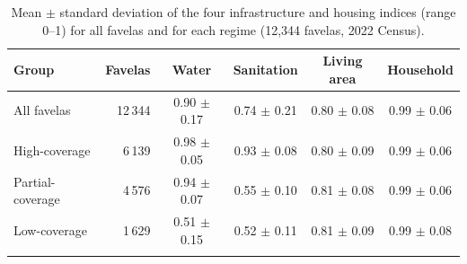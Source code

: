 \begin{table}[h]
\caption{Mean $\pm$ standard deviation of the four infrastructure and housing indices (range 0--1) for all favelas and for each regime (12,344 favelas, 2022 Census).}\label{tab:mean_sd}
\begin{tabular}{@{}lrcccc@{}}
\toprule
Group & Favelas & Water & Sanitation & Living area & Household \\
\midrule
All favelas & 12\,344 & 0.90 $\pm$ 0.17 & 0.74 $\pm$ 0.21 & 0.80 $\pm$ 0.08 & 0.99 $\pm$ 0.06 \\
\midrule
High-coverage & 6\,139 & 0.98 $\pm$ 0.05 & 0.93 $\pm$ 0.08 & 0.80 $\pm$ 0.09 & 0.99 $\pm$ 0.06 \\
Partial-coverage & 4\,576 & 0.94 $\pm$ 0.07 & 0.55 $\pm$ 0.10 & 0.81 $\pm$ 0.08 & 0.99 $\pm$ 0.06 \\
Low-coverage & 1\,629 & 0.51 $\pm$ 0.15 & 0.52 $\pm$ 0.11 & 0.81 $\pm$ 0.09 & 0.99 $\pm$ 0.08 \\
\botrule
\end{tabular}
\end{table}

